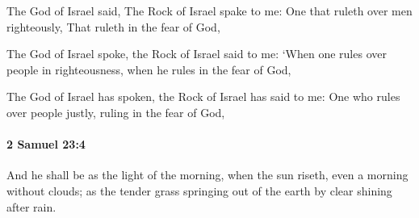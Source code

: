 			\begin{versebox}
					\item[BHS] 
					\item[ASV] The God of Israel said, The Rock of Israel spake to me: One that ruleth over men righteously, That ruleth in the fear of God,
					\item[NIV] The God of Israel spoke, the Rock of Israel said to me: ‘When one rules over people in righteousness, when he rules in the fear of God,
					\item[NRSV] The God of Israel has spoken, the Rock of Israel has said to me: One who rules over people justly, ruling in the fear of God,
			\end{versebox}

		\paragraph{2 Samuel 23:4} %
			\label{2SAMUEL-23-4}

			And he shall be as the light of the morning, when the sun riseth, even a morning without clouds; as the tender grass springing out of the earth by clear shining after rain.

